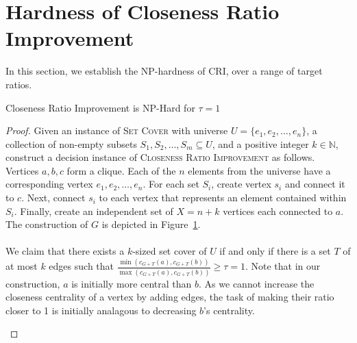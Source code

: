 \section{Hardness of Closeness Ratio Improvement}
In this section, we establish the NP-hardness of CRI, over a range of target ratios.

\begin{theorem}
    Closeness Ratio Improvement is NP-Hard for $\tau=1$
\end{theorem}

\begin{proof} 
    Given an instance of \textsc{Set Cover} with universe $U=\{e_1,e_2,\ldots,e_n\}$, a collection of non-empty subsets $S_1,S_2,\ldots,S_m\subseteq U$, and a positive integer $k\in\mathbb{N}$, construct a decision instance of \textsc{Closeness Ratio Improvement} as follows. Vertices $a,b,c$ form a clique. Each of the $n$ elements from the universe have a corresponding vertex $e_1,e_2,\ldots,e_n$. For each set $S_i$, create vertex $s_i$ and connect it to $c$. Next, connect $s_i$ to each vertex that represents an element contained within $S_i$. Finally, create an independent set of $X=n+k$ vertices each connected to $a$. The construction of $G$ is depicted in Figure~\ref{cri-instance}. \\\\
    We claim that there exists a $k$-sized set cover of $U$ if and only if there is a set $T$ of at most $k$ edges such that $\frac{\min(c_{G+T}(a),c_{G+T}(b))}{\max(c_{G+T}(a),c_{G+T}(b))}\geq\tau=1$. Note that in our construction, $a$ is initially more central than $b$. As we cannot increase the closeness centrality of a vertex by adding edges, the task of making their ratio closer to 1 is initially analagous to decreasing $b$'s centrality.
    \begin{figure} \label{cri-instance}
    \centering
\end{figure}
\end{proof}

